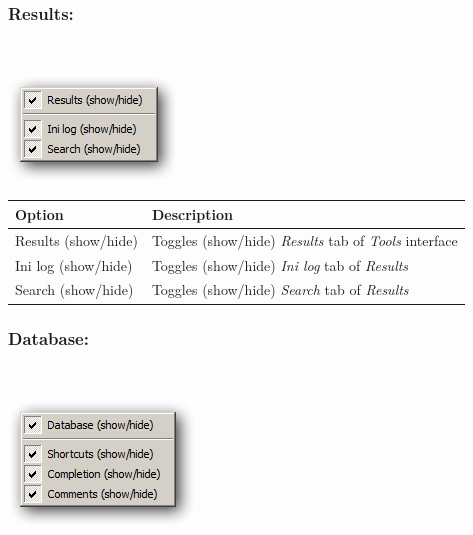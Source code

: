 \hypertarget{menu_view_tools_resources_results}{}
\subsubsection{Results:}\\

\includegraphics[scale=0.50]{./res/menu_view_tools_resources_results.png}\\

\begin{scriptsize}\begin{tabularx}{\textwidth}{>{\hsize=0.3\hsize}X>{\hsize=0.7\hsize}X}\\
    \hline
    \textbf{Option} & \textbf{Description} \\
    \hline
    Results (show/hide) & Toggles (show/hide) \textit{Results} tab of \textit{Tools} interface \\
    Ini log (show/hide) & Toggles (show/hide) \textit{Ini log} tab of \textit{Results} \\
    Search (show/hide) & Toggles (show/hide) \textit{Search} tab of \textit{Results} \\
    \hline
  \end{tabularx}\end{scriptsize}


\hypertarget{menu_view_tools_resources_database}{}
\subsubsection{Database:}\\

\includegraphics[scale=0.50]{./res/menu_view_tools_resources_database.png}\\


